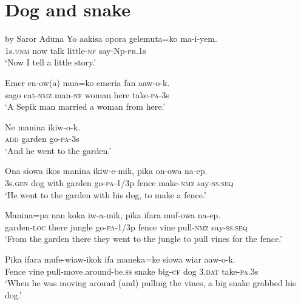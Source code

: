 \setcounter{equation}{0}
\section{ Dog and snake}
  by Saror Aduna
\ea\label{ex:a:x1}
\gll  Yo  aakisa  opora  gelemuta=ko  ma-i-yem. \\
1s.\textsc{unm}  now  talk  little-\textsc{nf}  say-Np-\textsc{pr}.1s \\
\glt ‘Now I tell a little story.’ \\
\z


\ea\label{ex:a:x2}
\gll  Emer  en-ow(a)  mua=ko  emeria  fan  aaw-o-k. \\
sago  eat-\textsc{nmz}  man-\textsc{nf}  woman  here  take-\textsc{pa}-3s \\
\glt ‘A Sepik man married a woman from here.’ \\
\z


\ea\label{ex:a:x3}
\gll  Ne  manina  ikiw-o-k. \\
\textsc{add}  garden  go-\textsc{pa}-3s \\
\glt ‘And he went to the garden.’ \\
\z


\ea\label{ex:a:x4}
\gll  Ona  siowa  ikos  manina  ikiw-e-mik,  pika  on-owa  na-ep. \\
3s.\textsc{gen}  dog  with  garden  go-\textsc{pa}-1/3p  fence  make-\textsc{nmz}  say-\textsc{ss.seq} \\
\glt ‘He went to the garden with his dog, to make a fence.’ \\
\z


\ea\label{ex:a:x5}
\gll  Manina=pa  nan  koka  iw-a-mik,  pika  ifara  muf-owa  na-ep. \\
garden-\textsc{loc}  there  jungle  go-\textsc{pa}-1/3p  fence  vine  pull-\textsc{nmz}  say-\textsc{ss.seq} \\
\glt ‘From the garden there they went to the jungle to pull vines for the fence.’ \\
\z


\ea\label{ex:a:x6}
\gll  Pika  ifara  mufe-wiaw-ikok  ifa  maneka=ke  siowa  wiar  aaw-o-k. \\
Fence  vine  pull-move.around-be.\textsc{ss}  snake  big-\textsc{cf}  dog  3.\textsc{dat}  take-\textsc{pa}.3s \\
\glt ‘When he was moving around (and) pulling the vines, a big snake grabbed his dog.’ \\
\z


